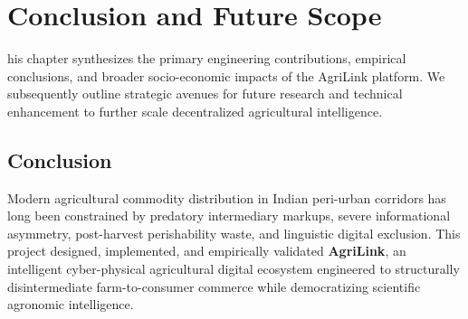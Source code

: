 \chapter{Conclusion and Future Scope}
\label{ch:Conclusion}
his chapter synthesizes the primary engineering contributions, empirical conclusions, and broader socio-economic impacts of the AgriLink platform. We subsequently outline strategic avenues for future research and technical enhancement to further scale decentralized agricultural intelligence.

\section{Conclusion}
\label{sec:Conc}
Modern agricultural commodity distribution in Indian peri-urban corridors has long been constrained by predatory intermediary markups, severe informational asymmetry, post-harvest perishability waste, and linguistic digital exclusion. This project designed, implemented, and empirically validated \textbf{AgriLink}, an intelligent cyber-physical agricultural digital ecosystem engineered to structurally disintermediate farm-to-consumer commerce while democratizing scientific agronomic intelligence.

